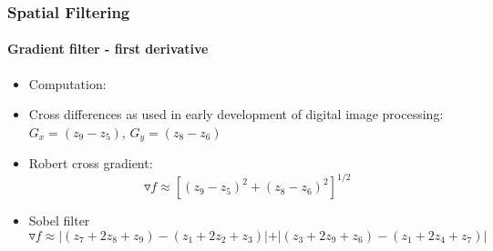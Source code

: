 \documentclass[table]{beamer}
\begin{document}
\begin{frame}
\frametitle{Spatial Filtering}
\framesubtitle{Gradient filter - first derivative}
\begin{itemize}
\item Computation:
\item Cross differences as used in early development of digital image processing: 
$G_x = (z_9 - z_5)$, \quad $ G_y = (z_8 - z_6)$
\item Robert cross gradient: 
$$ \triangledown f \approx [(z_9 - z_5)^2 + (z_8 - z_6)^2]^{1/2}$$
\item Sobel filter 
\scriptsize{
$$ \triangledown f \approx \vert (z_7 + 2 z_8 + z_9) - (z_1 + 2 z_2 + z_3) \vert + \vert (z_3 + 2 z_9 + z_6) - (z_1 + 2 z_4 + z_7) \vert$$
}
\end{itemize}

\end{frame}




\end{document}
